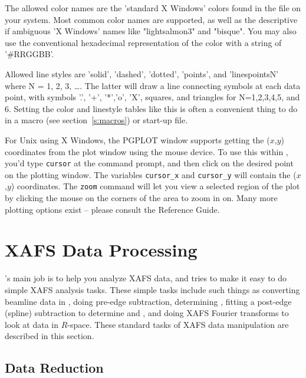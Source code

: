 \documentclass[11pt]{article}
\begin{document}
The allowed color names are the 'standard X Windows' colors found in the
{} file on your system.  Most common color names are
supported, as well as the descriptive if ambiguous 'X Windows' names like
"lightsalmon3" and "bisque".  You may also use the conventional hexadecimal
representation of the color with a string of '\#RRGGBB'.

Allowed line styles are 'solid', 'dashed', 'dotted', 'points', and
'linespointsN' where N = 1, 2, 3, \ldots.  The latter will draw a line
connecting symbols at each data point, with symbols '.', '+', '*','o', 'X',
squares, and triangles for N=1,2,3,4,5, and 6.  Setting the color and
linestyle tables like this is often a convenient thing to do in a macro
(see section~\ref{s:macros}) or start-up file.

For Unix using X Windows, the PGPLOT window supports getting the ($x$,$y$)
coordinates from the plot window using the mouse device.  To use this
within {\ifeffit}, you'd type {\tt{cursor}} at the command prompt, and then
click on the desired point on the plotting window.  The {\ifeffit}
variables {\tt{cursor\_x}} and {\tt{cursor\_y}} will contain the ($x$,$y$)
coordinates.  The {\tt{zoom}} command will let you view a selected region
of the plot by clicking the mouse on the corners of the area to zoom in on.
Many more plotting options exist -- please consult the Reference Guide.

\clearpage
\section{XAFS Data Processing}\label{s:xafs-process}

{\ifeffit}'s main job is to help you analyze XAFS data, and {\ifeffit}
tries to make it easy to do simple XAFS analysis tasks.  These simple tasks
include such things as converting beamline data in {\muE}, doing pre-edge
subtraction, determining {\Eo}, fitting a post-edge (spline) subtraction to
determine {\bkg} and {\chik}, and doing XAFS Fourier transforms to look at
data in $R$-space.  These standard tasks of XAFS data manipulation are
described in this section.

\subsection{Data Reduction}\label{s:xafs-process:reduce}
\end{document}
